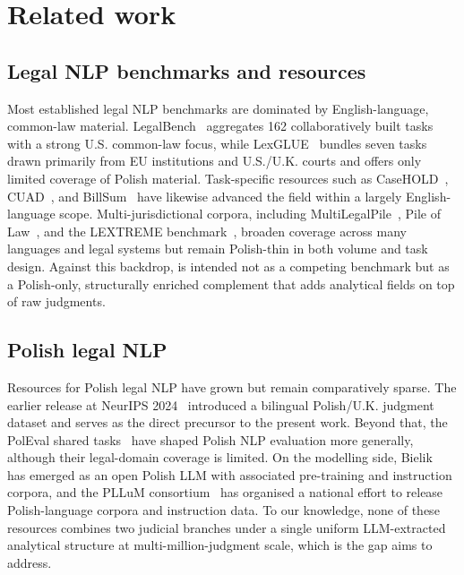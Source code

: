 
\section{Related work}
\label{sec:related-work}

\subsection{Legal NLP benchmarks and resources}
\label{sec:related:benchmarks}

Most established legal NLP benchmarks are dominated by English-language, common-law material. LegalBench~\citep{guhaLegalbenchCollaborativelyBuilt2023a} aggregates 162 collaboratively built tasks with a strong U.S. common-law focus, while LexGLUE~\citep{chalkidis-etal-2022-lexglue} bundles seven tasks drawn primarily from EU institutions and U.S./U.K. courts and offers only limited coverage of Polish material. Task-specific resources such as CaseHOLD~\citep{zheng2021does}, CUAD~\citep{hendrycks2021cuad}, and BillSum~\citep{kornilova2019billsum} have likewise advanced the field within a largely English-language scope. Multi-jurisdictional corpora, including MultiLegalPile~\citep{niklaus2024multilegalpile689gbmultilinguallegal}, Pile of Law~\citep{NEURIPS2022_bc218a0c}, and the LEXTREME benchmark~\citep{niklaus2023lextreme}, broaden coverage across many languages and legal systems but remain Polish-thin in both volume and task design. Against this backdrop, \juddgespl{} is intended not as a competing benchmark but as a Polish-only, structurally enriched complement that adds analytical fields on top of raw judgments.

\subsection{Polish legal NLP}
\label{sec:related:polish}

Resources for Polish legal NLP have grown but remain comparatively sparse. The earlier \juddges{} release at NeurIPS 2024~\citep{augustyniak2024juddges} introduced a bilingual Polish/U.K. judgment dataset and serves as the direct precursor to the present work. Beyond that, the PolEval shared tasks~\citep{poleval2024} have shaped Polish NLP evaluation more generally, although their legal-domain coverage is limited. On the modelling side, Bielik~\citep{bielik2025arxiv} has emerged as an open Polish LLM with associated pre-training and instruction corpora, and the PLLuM consortium~\citep{pllum2025} has organised a national effort to release Polish-language corpora and instruction data. To our knowledge, none of these resources combines two judicial branches under a single uniform LLM-extracted analytical structure at multi-million-judgment scale, which is the gap \juddgespl{} aims to address.

